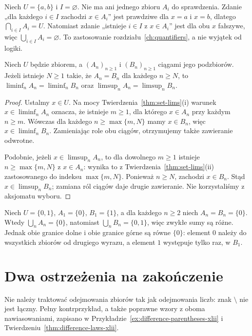\begin{przyklad}
Niech $U=\{a,b\}$ i $I=\varnothing$. Nie ma ani
jednego zbioru $A_i$ do sprawdzenia. Zdanie
„dla każdego $i\in I$ zachodzi $x\in A_i$”
jest prawdziwe dla $x=a$ i $x=b$, dlatego
$\bigcap_{i\in I}A_i=U$. Natomiast zdanie
„istnieje $i\in I$ z $x\in A_i$” jest dla obu
$x$ fałszywe, więc $\bigcup_{i\in I}A_i=\varnothing$.
To zastosowanie rozdziału~\ref{ch:quantifiers}, a nie
wyjątek od logiki.
\end{przyklad}

\begin{twierdzenie}\label{thm:lxiv-finite-set-modifications}
Niech $U$ będzie zbiorem, a $(A_n)_{n\ge1}$ i $(B_n)_{n\ge1}$
ciągami jego podzbiorów. Jeżeli istnieje $N\ge1$ takie, że
$A_n=B_n$ dla każdego $n\ge N$, to
$\liminf_n A_n=\liminf_n B_n$ oraz
$\limsup_n A_n=\limsup_n B_n$.
\end{twierdzenie}
\begin{proof}
Ustalmy $x\in U$. Na mocy Twierdzenia~\ref{thm:set-lims}(i)
warunek $x\in\liminf_n A_n$ oznacza, że istnieje $m\ge1$,
dla którego $x\in A_n$ przy każdym $n\ge m$.
Wówczas dla każdego $n\ge\max\{m,N\}$ mamy $x\in B_n$,
więc $x\in\liminf_n B_n$. Zamieniając role obu ciągów,
otrzymujemy także zawieranie odwrotne.

Podobnie, jeżeli $x\in\limsup_n A_n$, to dla dowolnego
$m\ge1$ istnieje $n\ge\max\{m,N\}$ z $x\in A_n$:
wynika to z Twierdzenia~\ref{thm:set-lims}(ii) zastosowanego
do indeksu $\max\{m,N\}$. Ponieważ $n\ge N$, zachodzi
$x\in B_n$. Stąd $x\in\limsup_n B_n$; zamiana ról
ciągów daje drugie zawieranie. Nie korzystaliśmy z aksjomatu wyboru.
\end{proof}
\begin{przyklad}\label{ex:lxiv-finite-set-modifications}
Niech $U=\{0,1\}$, $A_1=\{0\}$, $B_1=\{1\}$,
a dla każdego $n\ge2$ niech $A_n=B_n=\{0\}$.
Wtedy $\bigcup_n A_n=\{0\}$, natomiast
$\bigcup_n B_n=\{0,1\}$, więc zwykłe sumy są różne.
Jednak obie granice dolne i obie granice górne są równe $\{0\}$:
element $0$ należy do wszystkich zbiorów od drugiego wyrazu,
a element $1$ występuje tylko raz, w $B_1$.
\end{przyklad}

\section{Dwa ostrzeżenia na zakończenie}
\begin{przyklad}
Nie należy traktować odejmowania zbiorów tak jak odejmowania
liczb: znak $\setminus$ nie jest łączny. Pełny kontrprzykład,
a także poprawne wzory z oboma nawiasowaniami,
zapisano w Przykładzie~\ref{ex:difference-parentheses-xlii}
i Twierdzeniu~\ref{thm:difference-laws-xlii}.
\end{przyklad}

